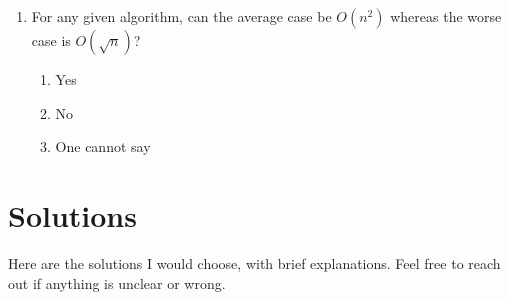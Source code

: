 \documentclass[11pt]{article}
\begin{document}
\begin{enumerate}
\item For any given algorithm, can the average case be \(O(n^2)\) whereas
the worse case is \(O(\sqrt{n})\)?
\begin{enumerate}
\item Yes
\item No
\item One cannot say
\end{enumerate}
\end{enumerate}



\section{Solutions}
\label{sec:org3486fee}

Here are the solutions I would choose, with brief explanations. Feel
free to reach out if anything is unclear or wrong.
\end{document}
